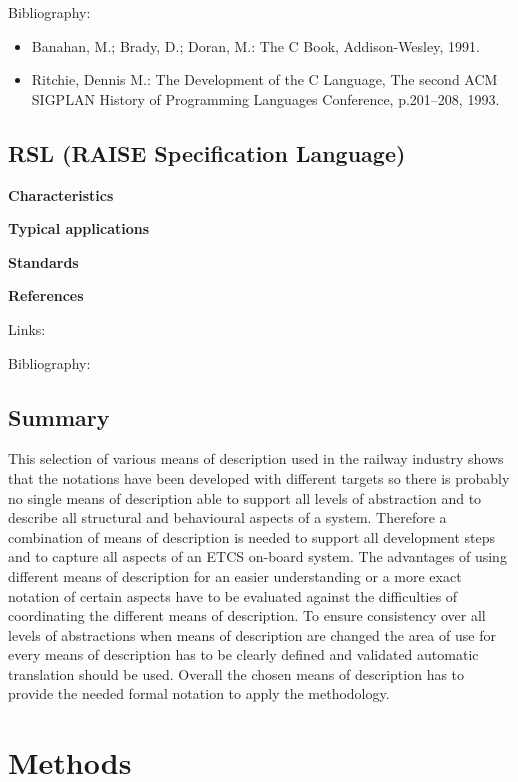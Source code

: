 \documentclass{./template/openetcs_report}
\begin{document}
Bibliography:

\begin{itemize}
\item Banahan, M.; Brady, D.; Doran, M.: The C Book, Addison-Wesley, 1991.
\item Ritchie, Dennis M.: The Development of the C Language, The second ACM SIGPLAN History of Programming Languages Conference, p.201–208, 1993.
\end{itemize}

\section {RSL (RAISE Specification Language)}


	\textbf{Characteristics}


	\textbf{Typical applications}


	\textbf{Standards}


	\textbf{References}

Links:



Bibliography:


\section{Summary}

This selection of various means of description used in the railway industry shows that the notations have been developed with different targets so there is probably no single means of description able to support all levels of abstraction and to describe all structural and behavioural aspects of a system. Therefore a combination of means of description is needed to support all development steps and to capture all aspects of an ETCS on-board system. The advantages of using different means of description for an easier understanding or a more exact notation of certain aspects have to be evaluated against the difficulties of coordinating the different means of description. To ensure consistency over all levels of abstractions when means of description are changed the area of use for every means of description has to be clearly defined and validated automatic translation should be used.  Overall the chosen means of description has to provide the needed formal notation to apply the methodology. 



\chapter{Methods}
\end{document}
